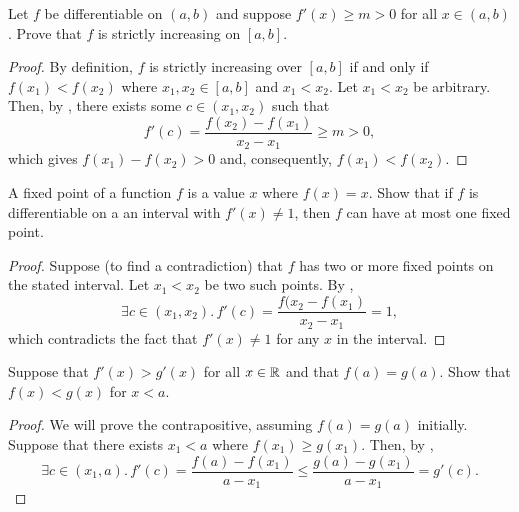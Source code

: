 \begin{problem}
  \label{prob:lower-bounded-deriv-strictly-increasing}
  Let $f$ be differentiable on $(a, b)$ and suppose $f'(x) \geq m > 0$ for all $x \in (a, b)$.
  Prove that $f$ is strictly increasing on $[a, b]$.

  \begin{proof}

    By definition, $f$ is strictly increasing over $[a, b]$ if and only if
    $f(x_{1}) < f(x_{2})$ where $x_{1}, x_{2} \in [a, b]$ and $x_{1} < x_{2}$.
    Let $x_{1} < x_{2}$ be arbitrary. Then, by ,
    there exists some $c \in (x_{1}, x_{2})$ such that
    \[
      f'(c) = \frac{f(x_{2}) - f(x_{1})}{x_{2} - x_{1}} \geq m > 0,
    \]
    which gives $f(x_{1}) - f(x_{2}) > 0$ and, consequently, $f(x_{1}) < f(x_{2})$. 
  \end{proof}
\end{problem}

\begin{problem}
  A fixed point of a function $f$ is a value $x$ where $f(x) = x$. Show that if
  $f$ is differentiable on a an interval with $f'(x) \neq 1$, then $f$ can have
  at most one fixed point.

  \begin{proof}
    Suppose (to find a contradiction) that $f$ has two or more fixed points on the stated interval.
    Let $x_{1} < x_{2}$ be two such points. By ,
    \[
      \exists c \in (x_{1}, x_{2}).\, f'(c) = \frac{f(x_{2} - f(x_{1})}{x_{2} - x_{1}} = 1,
    \]
    which contradicts the fact that $f'(x) \neq 1$ for any $x$ in the interval.
  \end{proof}
\end{problem}

\begin{problem}
  Suppose that $f'(x) > g'(x)$ for all $x \in \mathbb{R}$ and that $f(a) = g(a)$.
  Show that $f(x) < g(x)$ for $x < a$.

  \begin{proof}
    We will prove the contrapositive, assuming $f(a) = g(a)$ initially. Suppose
    that there exists $x_{1} < a$ where $f(x_{1}) \geq g(x_{1})$. Then, by
    ,
    \[
      \exists c \in (x_{1}, a).\, f'(c) = \frac{f(a) - f(x_{1})}{a - x_{1}} \leq \frac{g(a) - g(x_{1})}{a - x_{1}} = g'(c).
    \]
  \end{proof}
\end{problem}

